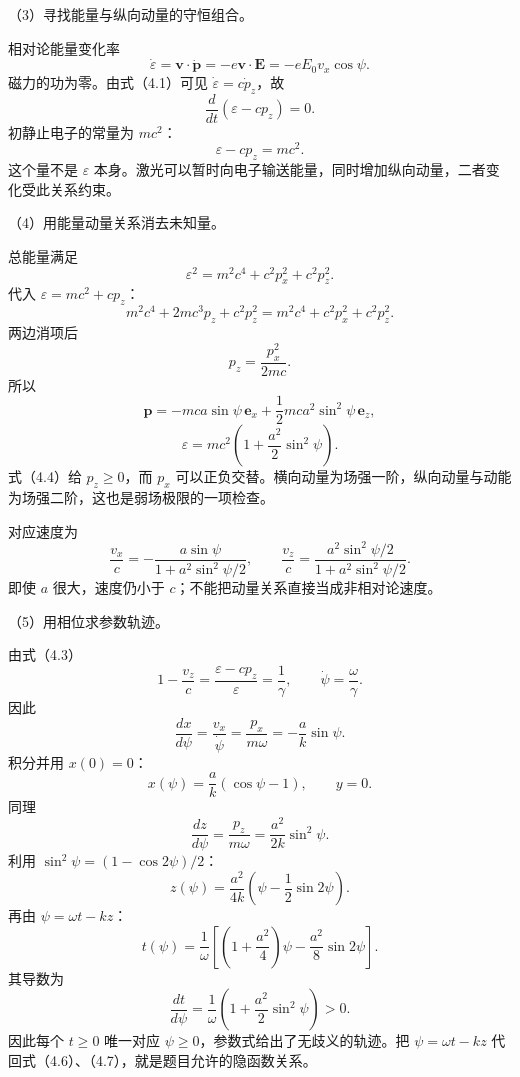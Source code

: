 \documentclass[12pt,a4paper,fontset=fandol]{ctexart}
\begin{document}
（3）寻找能量与纵向动量的守恒组合。

相对论能量变化率 \[
\dot\varepsilon=\mathbf v\cdot\dot{\mathbf p}
=-e\mathbf v\cdot\mathbf E
=-eE_0v_x\cos\psi.
\] 磁力的功为零。由式（4.1）可见 \(\dot\varepsilon=c\dot p_z\)，故 \[
\frac{d}{dt}(\varepsilon-cp_z)=0.
\] 初静止电子的常量为 \(mc^2\)： \[
\boxed{\varepsilon-cp_z=mc^2.}\tag{4.3}
\] 这个量不是 \(\varepsilon\)
本身。激光可以暂时向电子输送能量，同时增加纵向动量，二者变化受此关系约束。

（4）用能量动量关系消去未知量。

总能量满足 \[
\varepsilon^2=m^2c^4+c^2p_x^2+c^2p_z^2.
\] 代入 \(\varepsilon=mc^2+cp_z\)： \[
m^2c^4+2mc^3p_z+c^2p_z^2
=m^2c^4+c^2p_x^2+c^2p_z^2.
\] 两边消项后 \[
p_z=\frac{p_x^2}{2mc}.
\] 所以 \[
\boxed{
\mathbf p=-mca\sin\psi\,\mathbf e_x
+\frac12mca^2\sin^2\psi\,\mathbf e_z,}\tag{4.4}
\] \[
\boxed{\varepsilon=mc^2
\left(1+\frac{a^2}{2}\sin^2\psi\right).}\tag{4.5}
\] 式（4.4）给 \(p_z\ge0\)，而 \(p_x\)
可以正负交替。横向动量为场强一阶，纵向动量与动能为场强二阶，这也是弱场极限的一项检查。

对应速度为 \[
\frac{v_x}{c}=
-\frac{a\sin\psi}{1+a^2\sin^2\psi/2},\qquad
\frac{v_z}{c}=
\frac{a^2\sin^2\psi/2}{1+a^2\sin^2\psi/2}.
\] 即使 \(a\) 很大，速度仍小于
\(c\)；不能把动量关系直接当成非相对论速度。

（5）用相位求参数轨迹。

由式（4.3） \[
1-\frac{v_z}{c}
=\frac{\varepsilon-cp_z}{\varepsilon}
=\frac{1}{\gamma},
\qquad \dot\psi=\frac{\omega}{\gamma}.
\] 因此 \[
\frac{dx}{d\psi}
=\frac{v_x}{\dot\psi}
=\frac{p_x}{m\omega}
=-\frac a{k}\sin\psi.
\] 积分并用 \(x(0)=0\)： \[
\boxed{x(\psi)=\frac a{k}(\cos\psi-1),\qquad y=0.}\tag{4.6}
\] 同理 \[
\frac{dz}{d\psi}
=\frac{p_z}{m\omega}
=\frac{a^2}{2k}\sin^2\psi.
\] 利用 \(\sin^2\psi=(1-\cos2\psi)/2\)： \[
\boxed{z(\psi)=\frac{a^2}{4k}
\left(\psi-\frac12\sin2\psi\right).}\tag{4.7}
\] 再由 \(\psi=\omega t-kz\)： \[
\boxed{
t(\psi)=\frac1\omega
\left[\left(1+\frac{a^2}{4}\right)\psi
-\frac{a^2}{8}\sin2\psi\right].}\tag{4.8}
\] 其导数为 \[
\frac{dt}{d\psi}=\frac1\omega
\left(1+\frac{a^2}{2}\sin^2\psi\right)>0.
\] 因此每个 \(t\ge0\) 唯一对应
\(\psi\ge0\)，参数式给出了无歧义的轨迹。把 \(\psi=\omega t-kz\)
代回式（4.6）、（4.7），就是题目允许的隐函数关系。
\end{document}

